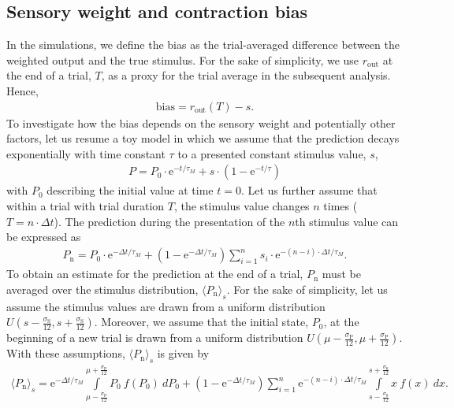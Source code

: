 \documentclass[10pt,a4paper]{article}
\begin{document}
\subsection{Sensory weight and contraction bias}
%
In the simulations, we define the bias as the trial-averaged difference between the weighted output and the true stimulus. For the sake of simplicity, we use $r_\mathrm{out}$ at the end of a trial, $T$, as a proxy for the trial average in the subsequent analysis. Hence, 
%
\begin{align}
 \mathrm{bias} = r_\mathrm{out}(T) - s.
\end{align}
%
To investigate how the bias depends on the sensory weight and potentially other factors, let us resume a toy model in which we assume that the prediction decays exponentially with time constant $\tau$ to a presented constant stimulus value, $s$,
%
\begin{align}
P = P_\mathrm{0} \cdot \mathrm{e}^{-t/\tau_M} +  s \cdot \left( 1 -   \mathrm{e}^{-t/\tau} \right)
\end{align}
%
with $P_0$ describing the initial value at time $t=0$. Let us further assume that within a trial with trial duration $T$, the stimulus value changes $n$ times ($T = n\cdot \Delta t$).  The prediction during the presentation of the $n$th stimulus value can be expressed as
%
\begin{align}
P_\mathrm{n} = P_\mathrm{0} \cdot \mathrm{e}^{-\Delta t/\tau_M}  + \left( 1 -   \mathrm{e}^{-\Delta t/\tau_M} \right) \sum_{i=1}^{n} s_i \cdot \mathrm{e}^{-(n-i)\cdot \Delta t/ \tau_M}.
\end{align}
%
To obtain an estimate for the prediction at the end of a trial, $P_\mathrm{n}$ must be averaged over the stimulus distribution, $\langle P_\mathrm{n} \rangle_s$. For the sake of simplicity, let us assume the stimulus values are drawn from a uniform distribution $U\left( s - \frac{\sigma_\mathrm{S}}{12}, s + \frac{\sigma_\mathrm{S}}{12} \right)$. Moreover, we assume that the initial state, $P_0$, at the beginning of a new trial is drawn from a uniform distribution $U\left( \mu - \frac{\sigma_\mathrm{P}}{12}, \mu + \frac{\sigma_\mathrm{P}}{12} \right)$. With these assumptions, $\langle P_\mathrm{n} \rangle_s$ is given by
%
\begin{align}
\langle P_\mathrm{n} \rangle_s = \mathrm{e}^{-\Delta t/\tau_M}  \int\limits_{\mu - \frac{\sigma_\mathrm{P}}{12}}^{\mu + \frac{\sigma_\mathrm{P}}{12}} P_\mathrm{0} \ f(P_\mathrm{0})\ dP_0+ \left( 1 -   \mathrm{e}^{-\Delta t/\tau_M} \right) \sum_{i=1}^{n} \mathrm{e}^{-(n-i)\cdot \Delta t/ \tau_M} \int\limits_{s - \frac{\sigma_\mathrm{S}}{12}}^{s + \frac{\sigma_\mathrm{S}}{12}} x\ f(x)\ dx.
\end{align}
\end{document}
